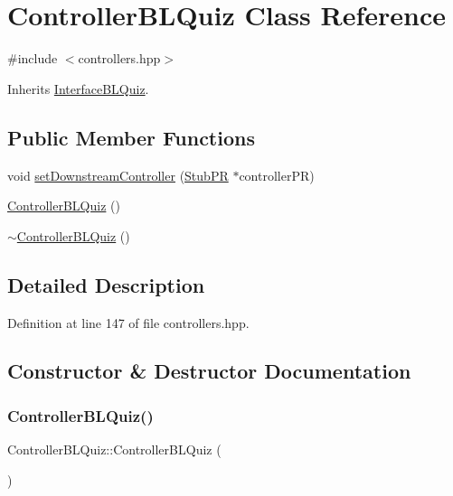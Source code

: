 \hypertarget{class_controller_b_l_quiz}{}\section{Controller\+B\+L\+Quiz Class Reference}
\label{class_controller_b_l_quiz}


{\ttfamily \#include $<$controllers.\+hpp$>$}



Inherits \hyperlink{class_interface_b_l_quiz}{Interface\+B\+L\+Quiz}.

\subsection*{Public Member Functions}
\begin{DoxyCompactItemize}
\item 
void \hyperlink{class_controller_b_l_quiz_a77ada4c0f633482129e9179e24f6f2a8}{set\+Downstream\+Controller} (\hyperlink{class_stub_p_r}{Stub\+PR} $\ast$controller\+PR)
\item 
\hyperlink{class_controller_b_l_quiz_a8639f523deca886b2f5f428e900e4f13}{Controller\+B\+L\+Quiz} ()
\item 
\hyperlink{class_controller_b_l_quiz_adaa97972e920e1640424530335f07703}{$\sim$\+Controller\+B\+L\+Quiz} ()
\end{DoxyCompactItemize}


\subsection{Detailed Description}


Definition at line 147 of file controllers.\+hpp.



\subsection{Constructor \& Destructor Documentation}
\mbox{\label{class_controller_b_l_quiz_a8639f523deca886b2f5f428e900e4f13}} 
\subsubsection{\texorpdfstring{Controller\+B\+L\+Quiz()}{ControllerBLQuiz()}}
{\footnotesize\ttfamily Controller\+B\+L\+Quiz\+::\+Controller\+B\+L\+Quiz (\begin{DoxyParamCaption}{ }\end{DoxyParamCaption})}



